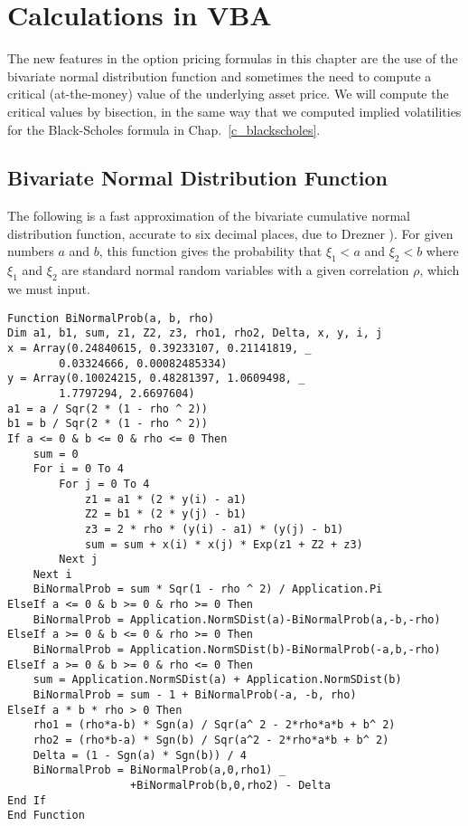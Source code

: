 \section{Calculations in VBA}\label{s_exotics_matlab}

The new features in the option pricing formulas in this chapter are the use of the bivariate normal distribution function and sometimes the need to compute a critical (at-the-money) value of the underlying asset price.  We will compute the critical values by bisection, in the same way that we computed implied volatilities for the Black-Scholes formula in Chap.~\ref{c_blackscholes}.

\subsection*{Bivariate Normal Distribution Function}

The following is a fast approximation of the bivariate  cumulative normal distribution function, accurate to six decimal places, due to Drezner \cite{Drezner}).  For given numbers $a$ and $b$, this function gives the probability that $\xi_1<a$ and $\xi_2<b$ where $\xi_1$ and $\xi_2$ are standard normal random variables with a given correlation $\rho$, which we must input.  

\small\begin{verbatim}
Function BiNormalProb(a, b, rho)
Dim a1, b1, sum, z1, Z2, z3, rho1, rho2, Delta, x, y, i, j
x = Array(0.24840615, 0.39233107, 0.21141819, _
        0.03324666, 0.00082485334)
y = Array(0.10024215, 0.48281397, 1.0609498, _
        1.7797294, 2.6697604)
a1 = a / Sqr(2 * (1 - rho ^ 2))
b1 = b / Sqr(2 * (1 - rho ^ 2))
If a <= 0 & b <= 0 & rho <= 0 Then
    sum = 0
    For i = 0 To 4
        For j = 0 To 4
            z1 = a1 * (2 * y(i) - a1)
            Z2 = b1 * (2 * y(j) - b1)
            z3 = 2 * rho * (y(i) - a1) * (y(j) - b1)
            sum = sum + x(i) * x(j) * Exp(z1 + Z2 + z3)
        Next j
    Next i
    BiNormalProb = sum * Sqr(1 - rho ^ 2) / Application.Pi
ElseIf a <= 0 & b >= 0 & rho >= 0 Then
    BiNormalProb = Application.NormSDist(a)-BiNormalProb(a,-b,-rho)
ElseIf a >= 0 & b <= 0 & rho >= 0 Then
    BiNormalProb = Application.NormSDist(b)-BiNormalProb(-a,b,-rho)
ElseIf a >= 0 & b >= 0 & rho <= 0 Then
    sum = Application.NormSDist(a) + Application.NormSDist(b)
    BiNormalProb = sum - 1 + BiNormalProb(-a, -b, rho)
ElseIf a * b * rho > 0 Then
    rho1 = (rho*a-b) * Sgn(a) / Sqr(a^ 2 - 2*rho*a*b + b^ 2)
    rho2 = (rho*b-a) * Sgn(b) / Sqr(a^2 - 2*rho*a*b + b^ 2)
    Delta = (1 - Sgn(a) * Sgn(b)) / 4
    BiNormalProb = BiNormalProb(a,0,rho1) _
                   +BiNormalProb(b,0,rho2) - Delta
End If
End Function
\end{verbatim}\normalsize

